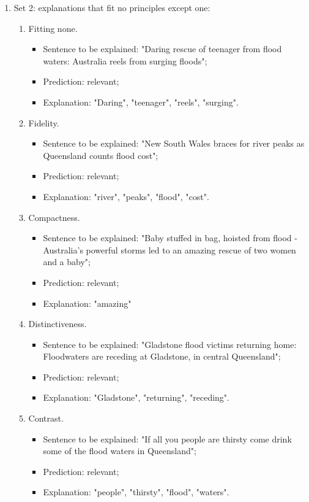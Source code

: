 \begin{enumerate}
\begin{enumerate}
        \item Set 2: explanations that fit no principles except one: \begin{enumerate}
            \item Fitting none. \begin{itemize}
                \item Sentence to be explained: "Daring rescue of teenager from flood waters: Australia reels from surging floods";
                \item Prediction: relevant;
                \item Explanation: "Daring", "teenager", "reels", "surging".
            \end{itemize}
            \item Fidelity. \begin{itemize}
                \item Sentence to be explained: "New South Wales braces for river peaks as Queensland counts flood cost";
                \item Prediction: relevant;
                \item Explanation: "river", "peaks", "flood", "cost".
            \end{itemize}
            \item Compactness. \begin{itemize}
                \item Sentence to be explained: "Baby stuffed in bag, hoisted from flood - Australia's powerful storms led to an amazing rescue of two women and a baby";
                \item Prediction: relevant;
                \item Explanation: "amazing"
            \end{itemize}
            \item Distinctiveness. \begin{itemize}
                \item Sentence to be explained: "Gladstone flood victims returning home: Floodwaters are receding at Gladstone, in central Queensland";
                \item Prediction: relevant;
                \item Explanation: "Gladstone", "returning", "receding".
            \end{itemize}
            \item Contrast. \begin{itemize}
                \item Sentence to be explained: "If all you people are thirsty come drink some of the flood waters in Queensland";
                \item Prediction: relevant;
                \item Explanation: "people", "thirsty", "flood", "waters".
            \end{itemize}
        \end{enumerate}
        

\end{enumerate}
\end{enumerate}

